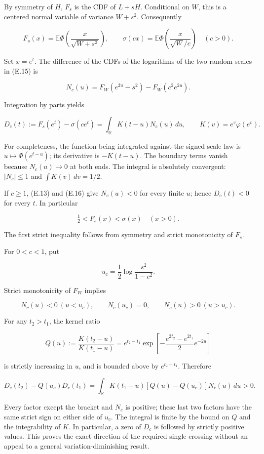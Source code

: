 \documentclass[
  11pt,
  a4paper,
]{article}
\begin{document}
By symmetry of \(H\), \(F_s\) is the CDF of \(L+sH\). Conditional on
\(W\), this is a centered normal variable of variance \(W+s^2\).
Consequently

\[
F_s(x)=\mathbb E\Phi\left(\frac{x}{\sqrt{W+s^2}}\right),
\qquad
\sigma(cx)=\mathbb E\Phi\left(\frac{x}{\sqrt W/c}\right)
\quad(c>0).
\tag{E.15}
\]

Set \(x=e^t\). The difference of the CDFs of the logarithms of the two
random scales in (E.15) is

\[
N_c(u)
=F_W(e^{2u}-s^2)-F_W(c^2e^{2u}).
\tag{E.16}
\]

Integration by parts yields

\[
D_c(t):=F_s(e^t)-\sigma(ce^t)
=\int_{\mathbb R}K(t-u)N_c(u)\,du,
\qquad K(v)=e^v\varphi(e^v).
\tag{E.17}
\]

For completeness, the function being integrated against the signed scale
law is \(u\mapsto\Phi(e^{t-u})\); its derivative is \(-K(t-u)\). The
boundary terms vanish because \(N_c(u)\to0\) at both ends. The integral
is absolutely convergent: \(|N_c|\le1\) and \(\int K(v)\,dv=1/2\).

If \(c\ge1\), (E.13) and (E.16) give \(N_c(u)<0\) for every finite
\(u\); hence \(D_c(t)<0\) for every \(t\). In particular

\[
\tfrac12<F_s(x)<\sigma(x)\quad(x>0).
\tag{E.18}
\]

The first strict inequality follows from symmetry and strict
monotonicity of \(F_s\).

For \(0<c<1\), put

\[
u_c=\frac12\log\frac{s^2}{1-c^2}.
\tag{E.19}
\]

Strict monotonicity of \(F_W\) implies

\[
N_c(u)<0\ (u<u_c),\qquad
N_c(u_c)=0,\qquad
N_c(u)>0\ (u>u_c).
\tag{E.20}
\]

For any \(t_2>t_1\), the kernel ratio

\[
Q(u):=\frac{K(t_2-u)}{K(t_1-u)}
=e^{t_2-t_1}
\exp\left[-\frac{e^{2t_2}-e^{2t_1}}2e^{-2u}\right]
\tag{E.21}
\]

is strictly increasing in \(u\), and is bounded above by
\(e^{t_2-t_1}\). Therefore

\[
D_c(t_2)-Q(u_c)D_c(t_1)
=\int_{\mathbb R}K(t_1-u)
  [Q(u)-Q(u_c)]N_c(u)\,du>0.
\tag{E.22}
\]

Every factor except the bracket and \(N_c\) is positive; these last two
factors have the same strict sign on either side of \(u_c\). The
integral is finite by the bound on \(Q\) and the integrability of \(K\).
In particular, a zero of \(D_c\) is followed by strictly positive
values. This proves the exact direction of the required single crossing
without an appeal to a general variation-diminishing result.
\end{document}
